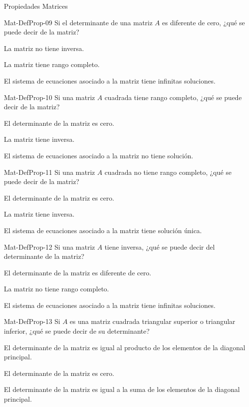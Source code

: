 \documentclass[a4,11pt]{aleph-notas}
\begin{document}
\begin{quiz}{Propiedades Matrices}
\begin{multi}[]%
    {Mat-DefProp-09}
    Si el determinante de una matriz $A$ es diferente de cero, ¿qué se puede decir de la matriz?
    \item La matriz no tiene inversa.
    \item* La matriz tiene rango completo.
    \item El sistema de ecuaciones asociado a la matriz tiene infinitas soluciones.
\end{multi}

\begin{multi}[]%
    {Mat-DefProp-10}
    Si una matriz $A$ cuadrada tiene rango completo, ¿qué se puede decir de la matriz?
    \item El determinante de la matriz es cero.
    \item* La matriz tiene inversa.
    \item El sistema de ecuaciones asociado a la matriz no tiene solución.
\end{multi}

\begin{multi}[]%
    {Mat-DefProp-11}
    Si una matriz $A$ cuadrada no tiene rango completo, ¿qué se puede decir de la matriz?
    \item* El determinante de la matriz es cero.
    \item La matriz tiene inversa.
    \item El sistema de ecuaciones asociado a la matriz tiene solución única.
\end{multi}

\begin{multi}[]%
    {Mat-DefProp-12}
    Si una matriz $A$ tiene inversa, ¿qué se puede decir del determinante de la matriz?
    \item* El determinante de la matriz es diferente de cero.
    \item La matriz no tiene rango completo.
    \item El sistema de ecuaciones asociado a la matriz tiene infinitas soluciones.
\end{multi}

\begin{multi}[]%
    {Mat-DefProp-13}
    Si $A$ es una matriz cuadrada triangular superior o triangular inferior, ¿qué se puede decir de su determinante?
    \item* El determinante de la matriz es igual al producto de los elementos de la diagonal principal.
    \item El determinante de la matriz es cero.
    \item El determinante de la matriz es igual a la suma de los elementos de la diagonal principal.
\end{multi}


\end{quiz}
\end{document}
